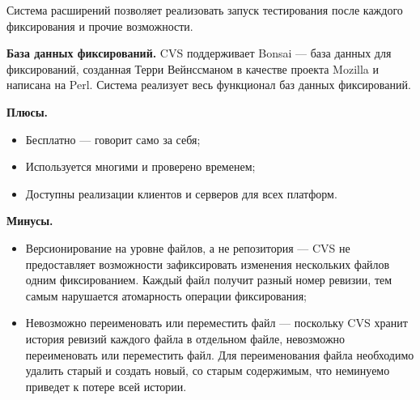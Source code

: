 Система расширений позволяет реализовать запуск тестирования после каждого фиксирования и прочие возможности.

\textbf{База данных фиксирований.} CVS поддерживает Bonsai --- база данных для фиксирований, созданная Терри Вейнссманом в качестве проекта Mozilla и написана на Perl. Система реализует весь функционал баз данных фиксирований.

\textbf{Плюсы.}
\begin{itemize}
\item Бесплатно --- говорит само за себя;
\item Используется многими и проверено временем;
\item Доступны реализации клиентов и серверов для всех платформ.
\end{itemize}

\textbf{Минусы.}
\begin{itemize}
\item Версионирование на уровне файлов, а не репозитория --- CVS не предоставляет возможности зафиксировать изменения нескольких файлов одним фиксированием. Каждый файл получит разный номер ревизии, тем самым нарушается атомарность операции фиксирования;
\item Невозможно переименовать или переместить файл --- поскольку CVS хранит история ревизий каждого файла в отдельном файле, невозможно переименовать или переместить файл. Для переименования файла необходимо удалить старый и создать новый, со старым содержимым, что неминуемо приведет к потере всей истории.
\end{itemize}






 
 
 

 



































\clearpage



